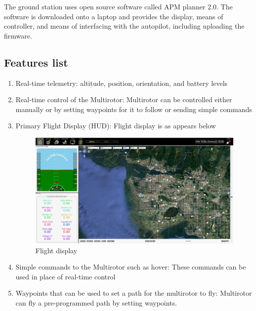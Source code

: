 The ground station uses open source software called APM planner 2.0. The software is downloaded onto a laptop and provides the display, means of controller, and means of interfacing with the autopilot, including uploading the firmware.

\subsection{Features list}

\begin{enumerate}

    \item Real-time telemetry: altitude, position, orientation, and battery levels
    
    \item Real-time control of the Multirotor: Multirotor can be controlled either manually or by setting waypoints for it to follow or sending simple commands
    
    \item Primary Flight Display (HUD): Flight display is as appears below
    
\begin{figure}[H]
	\centering
	\includegraphics[width=15cm]{img/HUD.png}
	\caption{Flight display}
	\label{flight display}
	\end{figure}

    \item Simple commands to the Multirotor such as hover: These commands can be used in place of real-time control
    
    \item Waypoints that can be used to set a path for the multirotor to fly: Multirotor can fly a pre-programmed path by setting waypoints.
    
\end{enumerate}


